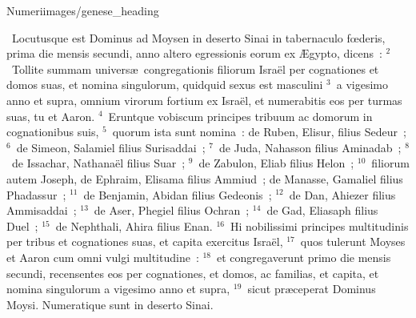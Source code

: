 {Numeri}{images/genese_heading}

~\lettrine[lines=10,image=true,loversize=0.05,lraise=-0.03]{L}{}ocutusque est Dominus ad Moysen in deserto Sinai in tabernaculo fœderis, prima die mensis secundi, anno altero egressionis eorum ex \AE gypto, dicens~:
${}^{2}$~Tollite summam univers\ae\ congregationis filiorum Isra\"el per cognationes et domos suas, et nomina singulorum, quidquid sexus est masculini
${}^{3}$~a vigesimo anno et supra, omnium virorum fortium ex Isra\"el, et numerabitis eos per turmas suas, tu et Aaron.
${}^{4}$~Eruntque vobiscum principes tribuum ac domorum in cognationibus suis,
${}^{5}$~quorum ista sunt nomina~: de Ruben, Elisur, filius Sedeur~;
${}^{6}$~de Simeon, Salamiel filius Surisaddai~;
${}^{7}$~de Juda, Nahasson filius Aminadab~;
${}^{8}$~de Issachar, Nathana\"el filius Suar~;
${}^{9}$~de Zabulon, Eliab filius Helon~;
${}^{10}$~filiorum autem Joseph, de Ephraim, Elisama filius Ammiud~; de Manasse, Gamaliel filius Phadassur~;
${}^{11}$~de Benjamin, Abidan filius Gedeonis~;
${}^{12}$~de Dan, Ahiezer filius Ammisaddai~;
${}^{13}$~de Aser, Phegiel filius Ochran~;
${}^{14}$~de Gad, Eliasaph filius Duel~;
${}^{15}$~de Nephthali, Ahira filius Enan.
${}^{16}$~Hi nobilissimi principes multitudinis per tribus et cognationes suas, et capita exercitus Isra\"el,
${}^{17}$~quos tulerunt Moyses et Aaron cum omni vulgi multitudine~:
${}^{18}$~et congregaverunt primo die mensis secundi, recensentes eos per cognationes, et domos, ac familias, et capita, et nomina singulorum a vigesimo anno et supra,
${}^{19}$~sicut pr\ae ceperat Dominus Moysi. Numeratique sunt in deserto Sinai.


